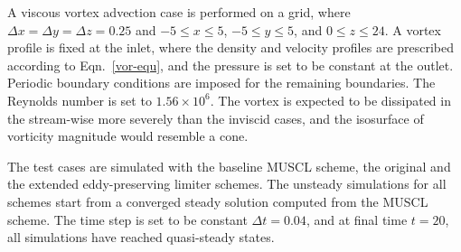 A viscous vortex advection case is performed on a grid, where $\Delta x=\Delta y=\Delta z=0.25$ and $-5\le x \le5$, $-5\le y \le 5$, and $0\le z \le 24$. A vortex profile is fixed at the inlet, where the density and velocity profiles are prescribed according to Eqn.~\ref{vor-equ}, and the pressure is set to be constant at the outlet. Periodic boundary conditions are imposed for the remaining boundaries. The Reynolds number is set to $1.56\times10^6$. The vortex is expected to be dissipated in the stream-wise more severely than the inviscid cases, and the isosurface of vorticity magnitude would resemble a cone.

The test cases are simulated with the baseline MUSCL scheme, the original and the extended eddy-preserving limiter schemes. The unsteady simulations for all schemes start from a converged steady solution computed from the MUSCL scheme. The time step is set to be constant $\Delta t=0.04$, and at final time $t=20$, all simulations have reached quasi-steady states.

